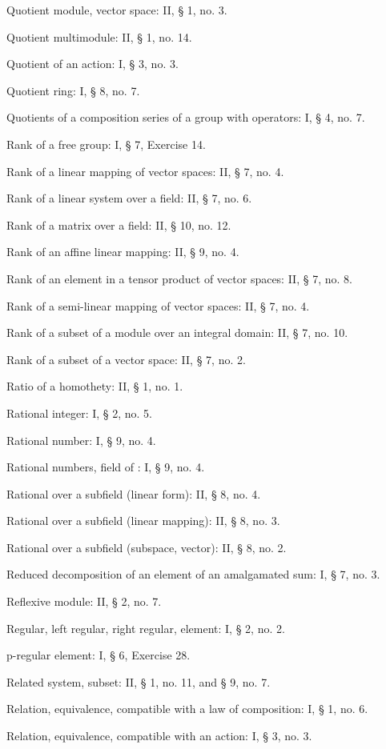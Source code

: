 Quotient module, vector space: II, § 1, no. 3.

Quotient multimodule: II, § 1, no. 14.

Quotient of an action: I, § 3, no. 3.

Quotient ring: I, § 8, no. 7.

Quotients of a composition series of a group with operators: I, § 4, no. 7.

Rank of a free group: I, § 7, Exercise 14.

Rank of a linear mapping of vector spaces: II, § 7, no. 4.

Rank of a linear system over a field: II, § 7, no. 6.

Rank of a matrix over a field: II, § 10, no. 12.

Rank of an affine linear mapping: II, § 9, no. 4.

Rank of an element in a tensor product of vector spaces: II, § 7, no. 8.

Rank of a semi-linear mapping of vector spaces: II, § 7, no. 4.

Rank of a subset of a module over an integral domain: II, § 7, no. 10.

Rank of a subset of a vector space: II, § 7, no. 2.

Ratio of a homothety: II, § 1, no. 1.

Rational integer: I, § 2, no. 5.

Rational number: I, § 9, no. 4.

Rational numbers, field of : I, § 9, no. 4.

Rational over a subfield (linear form): II, § 8, no. 4.

Rational over a subfield (linear mapping): II, § 8, no. 3.

Rational over a subfield (subspace, vector): II, § 8, no. 2.

Reduced decomposition of an element of an amalgamated sum: I, § 7, no. 3.

Reflexive module: II, § 2, no. 7.

Regular, left regular, right regular, element: I, § 2, no. 2.

p-regular element: I, § 6, Exercise 28.

Related system, subset: II, § 1, no. 11, and § 9, no. 7.

Relation, equivalence, compatible with a law of composition: I, § 1, no. 6.

Relation, equivalence, compatible with an action: I, § 3, no. 3.


